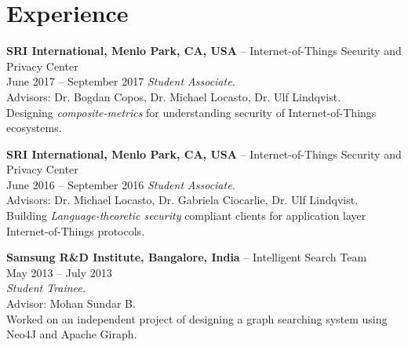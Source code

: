 \documentclass[letterpaper,10pt]{article}
\renewenvironment{itemize}{
  \begin{list}{}{
    \setlength{\leftmargin}{1.5em}
  }
}{
  \end{list}
}
\begin{document}
\section*{Experience}
\begin{itemize}
\setlength\itemsep{0ex}
\item \textbf{SRI International, Menlo Park, CA, USA} -- Internet-of-Things Security and Privacy Center\\
    June 2017 -- September 2017
    \textit{Student Associate.} \\ Advisors: Dr. Bogdan Copos, Dr. Michael Locasto, Dr. Ulf Lindqvist.\\
    Designing \textit{composite-metrics} for understanding security of Internet-of-Things ecosystems.
\item \textbf{SRI International, Menlo Park, CA, USA} -- Internet-of-Things Security and Privacy Center\\
    June 2016 -- September 2016
    \textit{Student Associate.} \\ Advisors: Dr. Michael Locasto, Dr. Gabriela Ciocarlie, Dr. Ulf Lindqvist.\\
    Building \textit{Language-theoretic security} compliant clients for application layer Internet-of-Things protocols.
\item \textbf{Samsung R\&D Institute, Bangalore, India} -- Intelligent Search Team\\
    May 2013 -- July 2013\\
    \textit{Student Trainee.} \\ Advisor: Mohan Sundar B.\\
    Worked on an independent project of designing a graph searching system using Neo4J and Apache Giraph.
\end{itemize}


\end{document}
